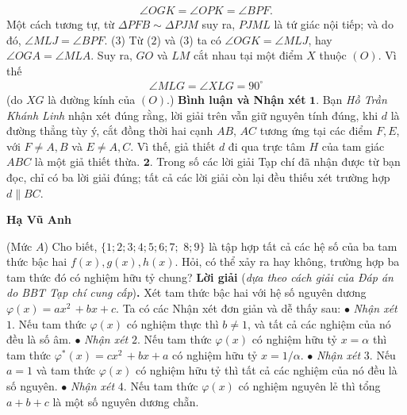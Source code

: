 \begin{multicols}{2}
	\begin{align*}
		\angle OGK = \angle OPK = \angle BPF. \tag{$2$}
	\end{align*}
	Một cách tương tự, từ $\Delta PFB \sim \Delta PJM$ suy ra, $PJML$ là tứ giác nội tiếp; và do đó,  $\angle MLJ = \angle BPF$.   \hfill ($3$)
	\vskip 0.05cm
	Từ ($2$) và ($3$) ta có $\angle OGK = \angle MLJ$, hay $\angle OGA = \angle MLA$. Suy ra, $GO$ và $LM$ cắt nhau tại một điểm $X$ thuộc $(O)$. Vì thế
	\begin{align*}
		\angle MLG = \angle XLG = 90^\circ
	\end{align*}
	(do $XG$ là đường kính của $(O)$.)
	\vskip 0.05cm
	\textbf{\color{thachthuctoanhoc}Bình luận và Nhận xét}
	\vskip 0.05cm
	$\pmb{1.}$ Bạn \textit{Hồ Trần Khánh Linh} nhận xét đúng rằng, lời giải trên vẫn giữ nguyên tính đúng, khi $d$ là đường thẳng tùy ý, cắt đồng thời hai cạnh $AB$, $AC$ tương ứng tại các điểm $F, E$, với $F \ne A, B$ và $E \ne A, C$. Vì thế, giả thiết $d$ đi qua trực tâm $H$ của tam giác $ABC$ là một giả thiết thừa.
	\vskip 0.05cm
	$\pmb{2.}$ Trong số các lời giải Tạp chí đã nhận được từ bạn đọc, chỉ có ba lời giải đúng; tất cả các lời giải còn lại đều thiếu xét trường hợp $d \parallel BC$.
	\begin{flushright}
		\textbf{\color{thachthuctoanhoc}Hạ Vũ Anh}
	\end{flushright}
	{}
	(Mức $A$) Cho biết, $\{1; 2; 3; 4; 5; 6; 7;$ \linebreak$8; 9\}$ là tập hợp tất cả các hệ số của ba tam thức bậc hai $f(x), g(x), h(x)$. Hỏi, có thể xảy ra hay không, trường hợp ba tam thức đó có nghiệm hữu tỷ chung?
	\vskip 0.05cm
	\textbf{\color{thachthuctoanhoc}Lời giải} (\textit{dựa theo cách giải của Đáp án do BBT Tạp chí cung cấp})\textbf{\color{thachthuctoanhoc}.}
	\vskip 0.05cm
	Xét tam thức bậc hai với hệ số nguyên dương $\varphi \left( x \right) = a{x^2}\, + bx + c$. Ta có các Nhận xét đơn giản và dễ thấy sau:
	\vskip 0.05cm
	$\bullet$ \textit{Nhận xét} $1$. Nếu tam thức $\varphi \left( x \right)$  có nghiệm thực thì $b \ne 1$, và tất cả các nghiệm của nó đều là số âm.
	\vskip 0.05cm
	$\bullet$ \textit{Nhận xét} $2$. Nếu tam thức $\varphi \left( x \right)$  có nghiệm hữu tỷ $x = \alpha$ thì tam thức ${\varphi ^ * }\left( x \right) = c{x^2}\, + bx + a$  có nghiệm hữu tỷ  $x = 1/\alpha$.
	\vskip 0.05cm
	$\bullet$ \textit{Nhận xét} $3$. Nếu $a = 1$ và tam thức $\varphi \left( x \right)$ có nghiệm hữu tỷ thì tất cả các nghiệm của nó đều là số nguyên.
	\vskip 0.05cm
	$\bullet$ \textit{Nhận xét} $4$. Nếu tam thức $\varphi \left( x \right)$  có nghiệm nguyên lẻ thì tổng $a + b + c$ là một số nguyên dương chẵn.

\end{multicols}
